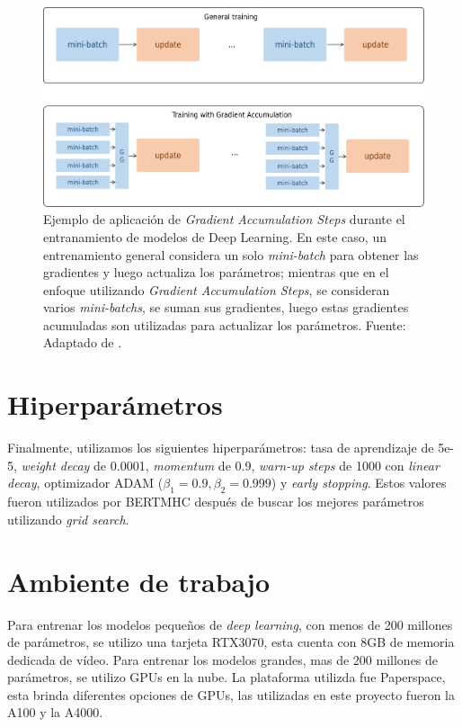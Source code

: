 \begin{figure}[H]
	\centering
	\includegraphics[width=\textwidth]{../img/proposal/gas_own}	
	\caption[Ejemplo de aplicación de \textit{Gradient Accumulation Steps}]{Ejemplo de aplicación de \textit{Gradient Accumulation Steps} durante el entranamiento de modelos de Deep Learning. En este caso, un entrenamiento general considera un solo \textit{mini-batch} para obtener las gradientes y luego actualiza los parámetros; mientras que en el enfoque utilizando \textit{Gradient Accumulation Steps}, se consideran varios \textit{mini-batchs}, se suman sus gradientes, luego estas gradientes acumuladas son utilizadas para actualizar los parámetros.  Fuente: Adaptado de  \cite{prince2023understanding}.}		
	\label{fig:gas_example}
\end{figure}



\section{Hiperparámetros}\label{sec:hyperparam}
Finalmente, utilizamos los siguientes hiperparámetros: tasa de aprendizaje de 5e-5, \textit{weight decay} de 0.0001, \textit{momentum} de 0.9, \textit{warn-up steps} de 1000 con \textit{linear decay}, optimizador ADAM ($\beta_1 = 0.9, \beta_2=0.999$) y \textit{early stopping}. Estos valores fueron utilizados por BERTMHC \citep{cheng2021bertmhc} después de buscar los mejores parámetros utilizando \textit{grid search}.

\section{Ambiente de trabajo}

Para entrenar los modelos pequeños de \textit{deep learning}, con menos de 200 millones de parámetros, se utilizo una tarjeta RTX3070, esta cuenta con 8GB de memoria dedicada de vídeo. Para entrenar los modelos grandes, mas de 200 millones de parámetros, se utilizo GPUs en la nube. La plataforma utilizda fue Paperspace, esta brinda diferentes opciones de GPUs, las utilizadas en este proyecto fueron la A100 y la A4000.


